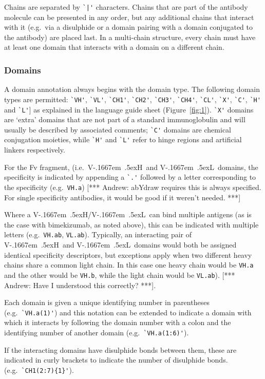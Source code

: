 \documentclass[a4paper]{article}
\newcommand{\VH}{\mbox{V\kern-.1667em \lower.5ex\hbox{\scriptsize H}}}
\newcommand{\VL}{\mbox{V\kern-.1667em \lower.5ex\hbox{\scriptsize L}}}
\newcommand{\VHVL}{\mbox{\VH/\VL}}
\newcommand{\andrew}[1]{{\color{red} [*** Andrew: #1 ***]}}
\begin{document}
Chains are separated by \verb.`|'.
characters. Chains that are part of the antibody molecule can be
presented in any order, but any additional chains that interact with it
(e.g.\ via a disulphide or a domain pairing with a domain conjugated to the antibody)
are placed last. In a multi-chain structure, every chain must have at least one domain
that interacts with a domain on a different chain.

\subsubsection{Domains}
A domain annotation always begins with the domain type.
The following domain types are permitted: 
\verb|`VH'|, \verb|`VL'|,
\verb|`CH1'|, \verb|`CH2'|, \verb|`CH3'|, \verb|`CH4'|, \verb|`CL'|,
\verb|`X'|, \verb|`C'|, \verb|`H'| and \verb|`L'|] as explained in the
language guide sheet (Figure~\ref{fig:1}). 
\verb|`X'| domains are `extra' domains that are not part of a
standard immunoglobulin and will usually be described by associated comments;
\verb|`C'| domains are chemical conjugation moieties, while \verb|`H'|
and \verb|`L'| refer to hinge regions and artificial linkers respectively.

For the Fv fragment, (i.e.\ \VH\ and \VL\ domains, the specificity is
indicated by appending a \verb|`.'| followed by a letter corresponding
to the specificity (e.g.\ \verb|VH.a|)  \andrew{abYdraw requires this
  is always specified. For single specificity antibodies, it would be
  good if it weren't needed.}

Where a \VHVL\ can bind multiple antigens (as is the case with
bimekizumab, as noted above), this can be indicated with multiple
letters (e.g.\ \verb|VH.ab|, \verb|VL.ab|).
Typically, an interacting pair of \VH\ and \VL\ domains
would both be assigned identical specificity descriptors, but
exceptions apply when two different heavy chains share a common light
chain.
In this case one heavy chain would be \verb|VH.a| and the other would
be \verb|VH.b|, while the light chain would be \verb|VL.ab|).
\andrew{Have I understood this correctly?}.


Each domain is given a unique identifying number in parentheses (e.g.\
\verb|`VH.a(1)'|) and this notation can be extended to indicate a domain
with which it interacts by following the domain number with a colon
and the identifying number of another domain (e.g.\
\verb|`VH.a(1:6)'|).

If the interacting domains have disulphide bonds between them, these
are indicated in curly brackets to indicate
the number of disulphide bonds. (e.g.\ \verb|`CH1(2:7){1}'|).
\end{document}
